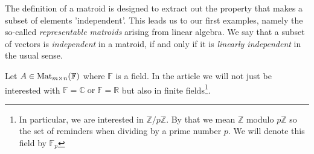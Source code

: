 The definition of a matroid is designed to extract out the property that makes a subset of elements 'independent'. This leads us to our first examples, namely the so-called \textit{representable matroids} arising from linear algebra. We say that a subset of vectors is \textit{independent} in a matroid, if and only if it is \textit{linearly independent} in the usual sense. 



 Let $A \in \operatorname{Mat}_{m \times n}(\mathbb{F})$ where $\mathbb{F}$ is a field. In the article we will not just be interested with $\mathbb{F} = \mathbb{C} \; \mathrm{or}\; \mathbb{F} = \mathbb{R} $ but also in finite fields\footnote{In particular, we are interested in $\mathbb{Z} / p\mathbb{Z}$. By that we mean $\mathbb{Z}$ modulo $p\mathbb{Z}$ so the set of reminders when dividing by a prime number $p$. We will denote this field by $\mathbb{F}_p$}.

